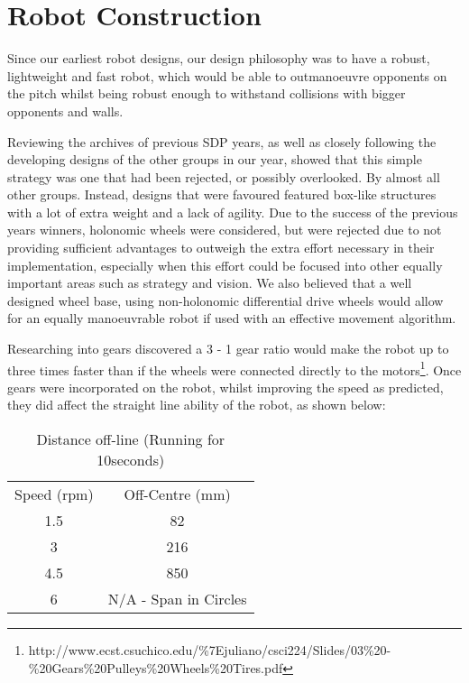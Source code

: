 \section{Robot Construction}

Since our earliest robot designs, our design philosophy was to have a robust, lightweight and fast robot, which would be able to outmanoeuvre opponents on the pitch whilst being robust enough to withstand collisions with bigger opponents and walls. 

Reviewing the archives of previous SDP years, as well as closely following the developing designs of the other groups in our year, showed that this simple strategy was one that had been rejected, or possibly overlooked. By almost all other groups. Instead, designs that were favoured featured box-like structures with a lot of extra weight and a lack of agility. Due to the success of the previous years winners, holonomic wheels were considered, but were rejected due to not providing sufficient advantages to outweigh the extra effort necessary in their implementation, especially when this effort could be focused into other equally important areas such as strategy and vision. We also believed that a well designed wheel base, using non-holonomic differential drive wheels would allow for an equally manoeuvrable robot if used with an effective movement algorithm.\linebreak

Researching into gears discovered a 3 - 1 gear ratio would make the robot up to three times faster than if the wheels were connected directly to the motors\footnote{http://www.ecst.csuchico.edu/\%7Ejuliano/csci224/Slides/03\%20-\%20Gears\%20Pulleys\%20Wheels\%20Tires.pdf}. Once gears were incorporated on the robot, whilst improving the speed as predicted, they did affect the straight line ability of the robot, as shown below:
\begin{table}[ht]
\caption{Distance off-line (Running for 10seconds)}
\centering
\begin{tabular}{c c}
\hline\hline
Speed (rpm) & Off-Centre (mm) \\
1.5 & 82 \\
3 & 216 \\
4.5 & 850 \\
6 & N/A - Span in Circles \\
\hline\hline
\end{tabular}
\label{table:offline}
\end{table}

